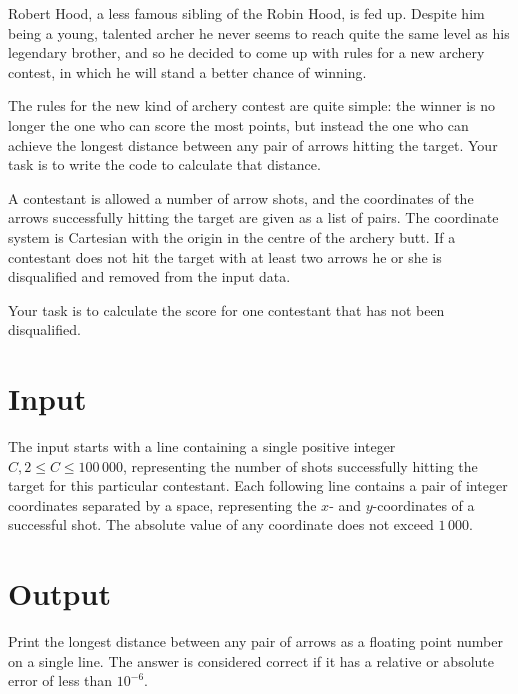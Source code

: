 

Robert Hood, a less famous sibling of the Robin Hood, is fed up. Despite him being a young, talented archer he never seems to reach quite the same level as his legendary brother, and so he decided to come up with rules for a new archery contest, in which he will stand a better chance of winning.

The rules for the new kind of archery contest are quite simple: the winner is no longer the one who can score the most points, but instead the one who can achieve the longest distance between any pair of arrows hitting the target. Your task is to write the code to calculate that distance.

A contestant is allowed a number of arrow shots, and the coordinates of the arrows successfully hitting the target are given as a list of pairs. The coordinate system is Cartesian with the origin in the centre of the archery butt. If a contestant does not hit the target with at least two arrows he or she is disqualified and removed from the input data.

Your task is to calculate the score for one contestant that has not been disqualified.

\section*{Input}
The input starts with a line containing a single positive integer $C, 2 \le C \le 100\,000$,
representing the number of shots successfully hitting the target for this particular contestant. Each
following line contains a pair of integer coordinates separated by a space, representing the $x$-
and $y$-coordinates of a successful shot. The absolute value of any coordinate does not exceed
$1\,000$.

\section*{Output}
Print the longest distance between any pair of arrows as a floating point
number on a single line. The answer is considered correct if it has a
relative or absolute error of less than $10^{-6}$.
